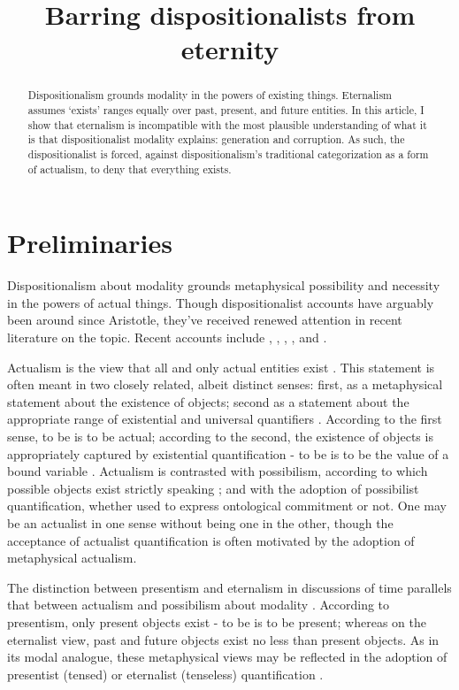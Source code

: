 \documentclass[]{article}
\title{Barring dispositionalists from eternity}
\author{}
\begin{document}
\maketitle

\begin{abstract}
Dispositionalism grounds modality in the powers of existing things. Eternalism assumes `exists' ranges equally over past, present, and future entities. In this article, I show that eternalism is incompatible with the most plausible understanding of what it is that dispositionalist modality explains: generation and corruption. As such, the dispositionalist is forced, against dispositionalism's traditional categorization as a form of actualism, to deny that everything exists.
\end{abstract}

\section{Preliminaries}
Dispositionalism about modality grounds metaphysical possibility and necessity in the powers of actual things. Though dispositionalist accounts have arguably been around since Aristotle, they've received renewed attention in recent literature on the topic. Recent accounts include \cite{Simchen2006}, \cite{Borghini2008}, \cite{Jacobs2010}, \cite{Vetter2013}, and \cite{Yates2015}.

Actualism is the view that all and only actual entities exist \cite{Plantinga1974} \cite{Plantinga1976} \cite{Adams1981}. This statement is often meant in two closely related, albeit distinct senses: first, as a metaphysical statement about the existence of objects; second as a statement about the appropriate range of existential and universal quantifiers \cite[p. 436]{LinskyZalta1994}. According to the first sense, to be is to be actual; according to the second, the existence of objects is appropriately captured by existential quantification - to be is to be the value of a bound variable \cite{Quine1948}. Actualism is contrasted with possibilism, according to which possible objects exist strictly speaking \cite{Lewis1986} \cite{Tomberlin1996}; and with the adoption of possibilist quantification, whether used to express ontological commitment or not. One may be an actualist in one sense without being one in the other, though the acceptance of actualist quantification is often motivated by the adoption of metaphysical actualism.

The distinction between presentism and eternalism in discussions of time parallels that between actualism and possibilism about modality \cite{Noonan2013}. According to presentism, only present objects exist - to be is to be present; whereas on the eternalist view, past and future objects exist no less than present objects. As in its modal analogue, these metaphysical views may be reflected in the adoption of presentist (tensed) or eternalist (tenseless) quantification \cite{Prior2003a} \cite{Baron2015}.
\end{document}
